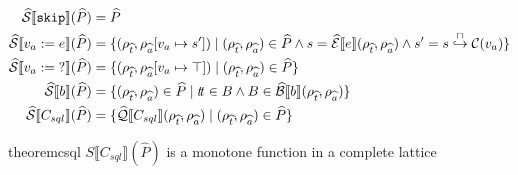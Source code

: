 \begin{align}
    \widehat{\mathcal{S}} \llbracket \texttt{skip} \rrbracket(\widehat{P}) &= \widehat{P} \\
    \widehat{\mathcal{S}} \llbracket v_a := e \rrbracket(\widehat{P}) &= \{(\rho_{\widehat{t}}, \rho_{\widehat{a}}[v_a \mapsto s']) \mid (\rho_{\widehat{t}}, \rho_{\widehat{a}}) \in \widehat{P} \land s = \widehat{\mathcal{E}}\llbracket e \rrbracket(\rho_{\widehat{t}}, \rho_{\widehat{a}}) \land s' = s \overset{\sqcap}{\hookrightarrow} \mathcal{C}(v_a) \} \\
    \widehat{\mathcal{S}} \llbracket v_a := \; ? \rrbracket(\widehat{P}) &= \{(\rho_{\widehat{t}}, \rho_{\widehat{a}}[v_a \mapsto \top]) \mid (\rho_{\widehat{t}}, \rho_{\widehat{a}}) \in \widehat{P} \} \\
    \widehat{\mathcal{S}} \llbracket b \rrbracket(\widehat{P}) &= \{ (\rho_{\widehat{t}}, \rho_{\widehat{a}}) \in \widehat{P} \mid t\!t \in B \land B \in \widehat{\mathcal{B}}\llbracket b \rrbracket(\rho_{\widehat{t}}, \rho_{\widehat{a}}) \} \\
    \widehat{\mathcal{S}} \llbracket C_{sql} \rrbracket(\widehat{P}) &= \{\widehat{\mathcal{Q}}\llbracket C_{sql} \rrbracket(\rho_{\widehat{t}}, \rho_{\widehat{a}}) \mid (\rho_{\widehat{t}}, \rho_{\widehat{a}}) \in \widehat{P} \}
\end{align}

\begin{restatable}{theorem}{csql}\label{thm:csql}
    $S\llbracket C_{sql}\rrbracket(\widehat{P})$ is a monotone function in a complete lattice
\end{restatable}

